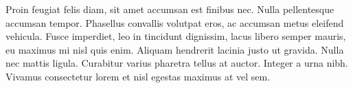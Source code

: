 Proin feugiat felis diam, sit amet accumsan est finibus nec. Nulla pellentesque
accumsan tempor. Phasellus convallis volutpat eros, ac accumsan metus eleifend
vehicula. Fusce imperdiet, leo in tincidunt dignissim, lacus libero semper
mauris, eu maximus mi nisl quis enim. Aliquam hendrerit lacinia justo ut
gravida. Nulla nec mattis ligula. Curabitur varius pharetra tellus at auctor.
Integer a urna nibh. Vivamus consectetur lorem et nisl egestas maximus at vel
sem.
